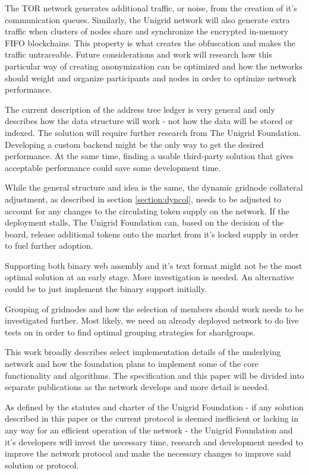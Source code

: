\documentclass[10pt,a4paper,final]{article}
\begin{document}
The TOR network generates additional traffic, or noise, from the creation of it's communication queues. Similarly, the Unigrid network will also generate extra traffic when clusters of nodes share and synchronize the encrypted in-memory FIFO blockchains. This property is what creates the obfuscation and makes the traffic untraceable. Future considerations and work will research how this particular way of creating anonymization can be optimized and how the networks should weight and organize participants and nodes in order to optimize network performance.

The current description of the address tree ledger is very general and only describes how the data structure will work - not how the data will be stored or indexed. The solution will require further research from The Unigrid Foundation. Developing a custom backend might be the only way to get the desired performance. At the same time, finding a usable third-party solution that gives acceptable performance could save some development time.

While the general structure and idea is the same, the dynamic \gls{gridnode} collateral adjustment, as described in section \ref{section:dyncol}, needs to be adjusted to account for any changes to the circulating token supply on the network. If the deployment stalls, The Unigrid Foundation can, based on the decision of the board, release additional tokens onto the market from it's locked supply in order to fuel further adoption.

Supporting both binary web assembly and it's text format might not be the most optimal solution at an early stage. More investigation is needed. An alternative could be to just implement the binary support initially.

Grouping of \glspl{gridnode} and how the selection of members should work needs to be investigated further. Most likely, we need an already deployed network to do live tests on in order to find optimal grouping strategies for \glspl{shardgroup}.

This work broadly describes select implementation details of the underlying network and how the foundation plans to implement some of the core functionality and algorithms. The specification and this paper will be divided into separate publications as the network develops and more detail is needed.

As defined by the statutes \cite{unigridstatutes} and charter \cite{unigridcharter} of the Unigrid Foundation - if any solution described in this paper or the current protocol is deemed inefficient or lacking in any way for an efficient operation of the network - the Unigrid Foundation and it's developers will invest the necessary time, research and development needed to improve the network protocol and make the necessary changes to improve said solution or protocol.
\end{document}
